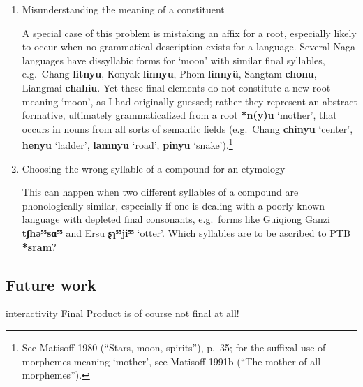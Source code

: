 \begin{itemize}
\begin{enumerate}
This can happen when a form in an inadequately transcribed source is not
syllabified.  The Pochury and Sangtam forms for ‘star’, transcribed as \textbf{awutsi}
and \textbf{chinghi}, respectively, in the little glossaries compiled by the
\textit{Nagaland
Bhasha Parishad},\footnote{Kumar et al., \textit{Hindi Pochury English Dictionary} (1972);
\textit{Hindi
Sangtam English Dictionary} (1973). Kohima: Linguistic Circle of Nagaland.}
 should
be segmented as \textbf{a-wu-tsi} and \textbf{ching-hi},
and not as \textbf{a-wut-si} and \textbf{chi-nghi}, as I
imprudently did in Matisoff 1980:21.


\item Misunderstanding the meaning of a constituent

A special case of this problem is mistaking an affix for a root, especially
likely to occur when no grammatical description exists for a language. Several
Naga languages have dissyllabic forms for ‘moon’ with similar final syllables,
e.g.\ Chang \textbf{litnyu}, Konyak \textbf{linnyu},
Phom \textbf{linnyü}, Sangtam \textbf{chonu}, Liangmai \textbf{chahiu}.
Yet these final elements do not constitute a new root meaning ‘moon’, as I had
originally guessed; rather they represent an abstract formative, ultimately
grammaticalized from a root \textbf{*n(y)u} ‘mother’, that occurs in nouns from all sorts
of semantic fields (e.g.\ Chang \textbf{chinyu} ‘center’,
\textbf{henyu} ‘ladder’, \textbf{lamnyu} ‘road’,
\textbf{pinyu} ‘snake’).\footnote{See Matisoff 1980 (“Stars, moon, spirits”), p.\ 35;
for the
suffixal use of morphemes meaning ‘mother’, see Matisoff 1991b (“The mother of all
morphemes”).}


\item Choosing the wrong syllable of a compound for an etymology

This can happen when two different syllables of a compound are phonologically
similar, especially if one is dealing with a poorly known language with depleted
final consonants, e.g.\ forms like Guiqiong Ganzi \textbf{tʃhə⁵⁵sɑ̃⁵⁵}
and Ersu \textbf{ʂɿ⁵⁵ji⁵⁵} ‘otter’.
Which syllables are to be ascribed to PTB \textbf{*sram}? 
\end{enumerate}

\end{itemize}

\subsection{Future work}
interactivity
Final Product is of course not final at all!


